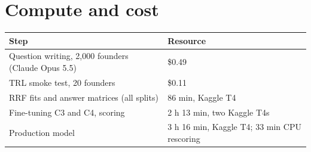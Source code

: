 \documentclass{article}
\newcommand{\cond}[1]{#1}
\begin{document}
\section{Compute and cost}

\begin{center}\small
\begin{tabular}{@{}l l@{}}
\toprule
Step & Resource \\
\midrule
Question writing, 2,000 founders (Claude Opus 5.5) & \$0.49 \\
TRL smoke test, 20 founders & \$0.11 \\
RRF fits and answer matrices (all splits) & 86 min, Kaggle T4 \\
Fine-tuning \cond{C3} and \cond{C4}, scoring & 2 h 13 min, two Kaggle T4s \\
Production model & 3 h 16 min, Kaggle T4; 33 min CPU rescoring \\
\bottomrule
\end{tabular}
\end{center}
\end{document}
